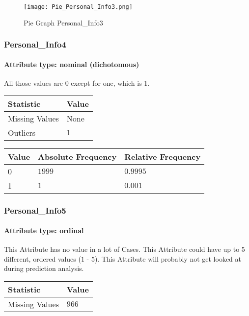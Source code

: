 \begin{figure}[H]
	\begin{center}
		\texttt{[image: Pie\_Personal\_Info3.png]}
	\end{center}
	\caption{Pie Graph Personal\_Info3}
\end{figure}

\subsubsection{Personal\_Info4}
\paragraph{Attribute type: nominal (dichotomous)} \quad All those values are $0$ except for one, which is $1$.

\begin{table}[H]
	\renewcommand{\arraystretch}{1.25}
	\begin{tabular}{l|l}
		\textbf{Statistic} & \textbf{Value}\\\hline
		Missing Values& None\\\hline
		Outliers & $1$
	\end{tabular}
\end{table}
\begin{table}[H]
	\renewcommand{\arraystretch}{1.25}
	\begin{tabular}{l|l|l}
		\textbf{Value} & \textbf{Absolute Frequency} & \textbf{Relative Frequency}\\\hline
		0&$1999$&$0.9995$\\\hline
		1&$1$&$0.001$
	\end{tabular}
\end{table}


\subsubsection{Personal\_Info5}
\paragraph{Attribute type: ordinal}This Attribute has no value in a lot of Cases. This Attribute could have up to 5 different, ordered values ($1$ - $5$). This Attribute will probably not get looked at during prediction analysis.

\begin{table}[H]
	\renewcommand{\arraystretch}{1.25}
	\begin{tabular}{l|l}
		\textbf{Statistic} & \textbf{Value}\\\hline
		Missing Values& $966$\\\hline
	\end{tabular}
\end{table}

